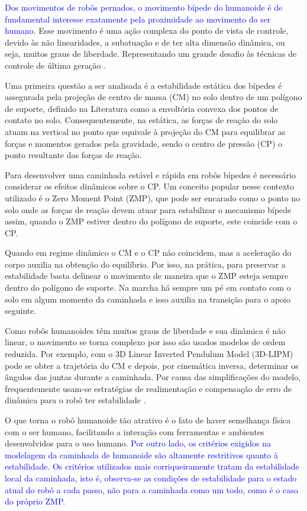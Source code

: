\textcolor{blue}{Dos movimentos de robôs pernados, o movimento bípede do humanoide é de fundamental interesse exatamente pela proximidade ao movimento do ser humano.} Esse movimento é uma ação complexa do ponto de vista de controle, devido às não linearidades, a subatuação e  de ter alta dimensão dinâmica, ou seja, muitos graus de liberdade. Representando um grande desafio às técnicas de controle de última geração \cite{tedrake2005}.

Uma primeira questão a ser analisada é a estabilidade estática dos bípedes é assegurada pela projeção de centro de massa (CM) no solo dentro de um polígono de suporte, definido na Literatura como a envoltória convexa dos pontos de contato no solo. Consequentemente, na estática, as forças de reação do solo atuam na vertical no ponto que equivale à projeção do CM para equilibrar as forças e momentos gerados pela gravidade, sendo o centro de pressão (CP) o ponto resultante das forças de reação.

Para desenvolver uma caminhada estável e rápida em robôs bípedes é necessário considerar os efeitos dinâmicos sobre o CP. Um conceito popular nesse contexto  utilizado é o Zero Moment Point (ZMP), que pode ser encarado  como o ponto no solo onde as forças de reação devem atuar para estabilizar o mecanismo bípede \cite{vukobratovic2004} assim, quando o ZMP estiver dentro do polígono de suporte, este coincide com o CP.

Quando em regime dinâmico o CM e o CP não coincidem, mas a aceleração do corpo auxilia na obtenção do equilíbrio. Por isso, na prática, para preservar a estabilidade basta delinear o movimento de maneira que o ZMP esteja sempre dentro do polígono de suporte. Na marcha há sempre um pé em contato com o solo em algum momento da caminhada e isso auxilia na transição para o apoio seguinte.

Como robôs humanoides têm muitos graus de liberdade e sua dinâmica é não linear, o movimento se torna complexo por isso são usados modelos de ordem reduzida.  Por exemplo, com o 3D Linear Inverted Pendulum Model (3D-LIPM)\cite{kajita2001} pode se obter a trajetória do CM e depois, por cinemática inversa, determinar os ângulos das juntas durante a caminhada. Por causa das simplificações do modelo, frequentemente usam-se estratégias de realimentação e compensação de erro de dinâmica para o robô ter estabilidade \cite{yoshiike2009}.


O que torna o robô humanoide tão atrativo é o fato de haver semelhança física com o ser humano, facilitando a interação com ferramentas e ambientes desenvolvidos para o uso humano. \textcolor{blue}{Por outro lado, os critérios exigidos na modelagem da caminhada de humanoide são altamente restritivos quanto à estabilidade. Os critérios utilizados mais corriqueiramente tratam da estabilidade local da caminhada, isto é, observa-se as condições de estabilidade para o estado atual do robô a cada passo, não para a caminhada como um todo, como é o caso do próprio ZMP.}

